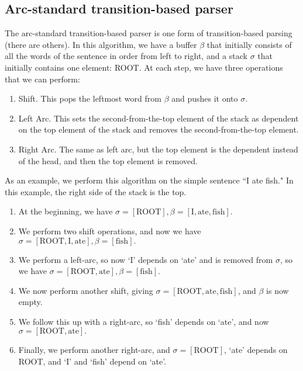 \subsection{Arc-standard transition-based parser}
The arc-standard transition-based parser is one form of transition-based parsing (there are others). In this algorithm, we have a buffer $\beta$ that initially consists of all the words of the sentence in order from left to right, and a stack $\sigma$ that initially contains one element: ROOT. At each step, we have three operations that we can perform:
\begin{enumerate}
\item Shift. This pops the leftmost word from $\beta$ and pushes it onto $\sigma$.
\item Left Arc. This sets the second-from-the-top element of the stack as dependent on the top element of the stack and removes the second-from-the-top element.
\item Right Arc. The same as left arc, but the top element is the dependent instead of the head, and then the top element is removed.
\end{enumerate}
As an example, we perform this algorithm on the simple sentence ``I ate fish." In this example, the right side of the stack is the top.
\begin{enumerate}
\item At the beginning, we have $\sigma = [\text{ROOT}], \beta = [\text{I}, \text{ate}, \text{fish}].$
\item We perform two shift operations, and now we have $\sigma = [\text{ROOT}, \text{I}, \text{ate}], \beta = [\text{fish}].$
\item We perform a left-arc, so now `I' depends on `ate' and is removed from $\sigma$, so we have $\sigma = [\text{ROOT}, \text{ate}], \beta = [\text{fish}].$
\item We now perform another shift, giving $\sigma = [\text{ROOT}, \text{ate}, \text{fish}]$, and $\beta$ is now empty.
\item We follow this up with a right-arc, so `fish' depends on `ate', and now $\sigma = [\text{ROOT}, \text{ate}].$
\item Finally, we perform another right-arc, and $\sigma = [\text{ROOT}]$, `ate' depends on ROOT, and `I' and `fish' depend on `ate'.
\end{enumerate}
